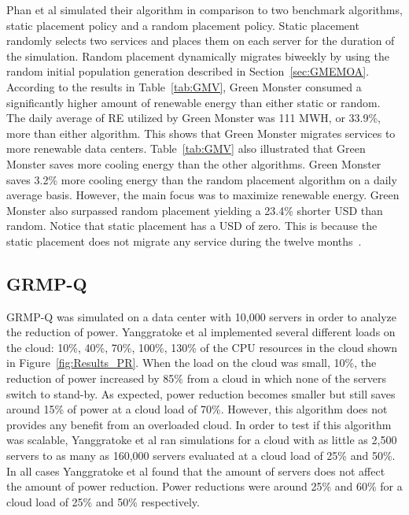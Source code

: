 \documentclass{sig-alternate}
\begin{document}
Phan et al simulated their algorithm in comparison to two benchmark algorithms, static placement policy and a random placement policy. Static placement randomly selects two services and places them on each server for the duration of the simulation. Random placement dynamically migrates biweekly by using the random initial population generation described in Section~\ref{sec:GMEMOA}. According to the results in Table~\ref{tab:GMV}, Green Monster consumed a significantly higher amount of renewable energy than either static or random. The daily average of RE utilized by Green Monster was 111 MWH, or 33.9\%, more than either algorithm. This shows that Green Monster migrates services to more renewable data centers.  Table~\ref{tab:GMV} also illustrated that Green Monster saves more cooling energy than the other algorithms. Green Monster saves 3.2\% more cooling energy than the random placement algorithm on a daily average basis. However, the main focus was to maximize renewable energy. Green Monster also surpassed random placement yielding a 23.4\% shorter USD than random.  Notice that static placement has a USD of zero. This is because the static placement does not migrate any service during the twelve months~\cite{Phan}.   


\subsection{GRMP-Q}
\label{sec:GRMP-Q}

GRMP-Q was simulated on a data center with 10,000 servers in order to analyze the reduction of power. Yanggratoke et al implemented several different loads on the cloud: 10\%, 40\%, 70\%, 100\%, 130\% of the CPU resources in the cloud shown in Figure~\ref{fig:Results_PR}. When the load on the cloud was small, 10\%, the reduction of power increased by 85\% from a cloud in which none of the servers switch to stand-by. As expected, power reduction becomes smaller but still saves around 15\% of power at a cloud load of 70\%.  However, this algorithm does not provides any benefit from an overloaded cloud.  In order to test if this algorithm was scalable, Yanggratoke et al ran simulations for a cloud with as little as 2,500 servers to as many as 160,000 servers evaluated at a cloud load of 25\% and 50\%. In all cases Yanggratoke et al found that the amount of servers does not affect the amount of power reduction. Power reductions were around 25\% and 60\% for a cloud load of 25\% and 50\% respectively.  

\end{document}
